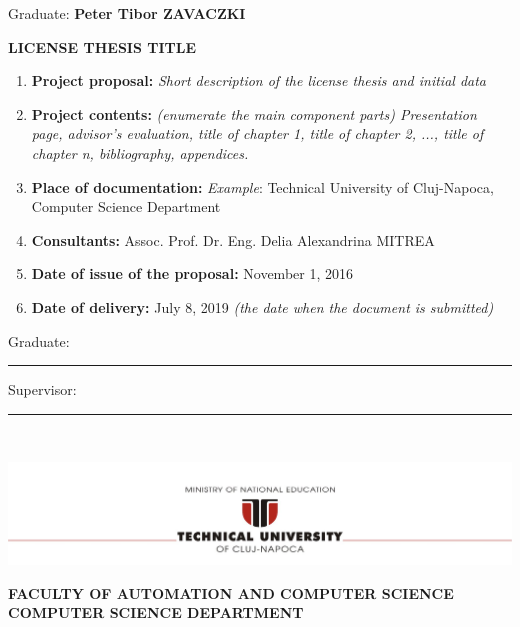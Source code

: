 \documentclass[12pt,a4paper,twoside]{report}
\renewcommand{\thesisauthor}{Peter Tibor ZAVACZKI}    %
\renewcommand{\thesistitle}{LICENSE THESIS TITLE}
\renewcommand{\thesissupervisor}{Assoc. Prof. Dr. Eng. Delia Alexandrina MITREA}
\newcommand{\department}{\bf FACULTY OF AUTOMATION AND COMPUTER SCIENCE\\
COMPUTER SCIENCE DEPARTMENT}
\newcommand{\utcnlogo}{\includegraphics[width=15cm]{img/tucn.jpg}}
\newcommand{\uline}[1]{\rule[0pt]{#1}{0.4pt}}
\begin{document}
\vspace{2cm}

\begin{center}
Graduate: {\bf \thesisauthor}

\vspace{1cm}

{\bf \thesistitle}
\end{center}

\vspace{1cm}

\begin{enumerate}
 \item {\bf Project proposal:} {\it Short description of the license thesis and initial data}
\item {\bf Project contents:} {\it (enumerate the main component parts) Presentation page, advisor's evaluation, title of chapter 1, title of chapter 2, ..., title of chapter n, bibliography, appendices.}
\item {\bf Place of documentation:} {\it Example}: Technical University of Cluj-Napoca, Computer Science Department
\item {\bf Consultants:} \thesissupervisor
\item {\bf Date of issue of the proposal:} November 1, 2016
\item {\bf Date of  delivery:} July 8, 2019 {\it (the date when the document is submitted)}
  \end{enumerate}
\vspace{1.2cm}

\hspace{6cm} Graduate: \uline{6cm} 

\vspace{0.5cm}
\hspace{6cm} Supervisor: \uline{6cm} 

\thispagestyle{empty}


\newpage
$ $


\thispagestyle{empty}
\newpage

\begin{center}
\utcnlogo

\department
\end{center}

\vspace{0.5cm}
\end{document}
